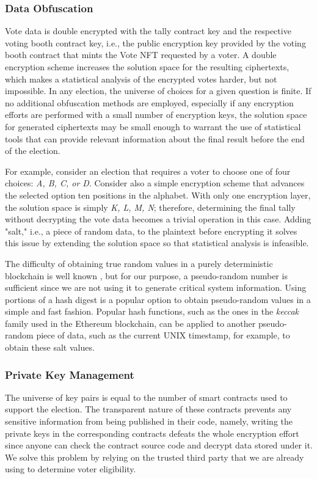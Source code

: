 \documentclass[../main.tex]{subfiles}
\begin{document}
\subsubsection{Data Obfuscation}
\label{sec:data_obfuscation}
Vote data is double encrypted with the tally contract key and the respective voting booth contract key, i.e., the public encryption key provided by the voting booth contract that mints the Vote NFT requested by a voter. A double encryption scheme increases the solution space for the resulting ciphertexts, which makes a statistical analysis of the encrypted votes harder, but not impossible. In any election, the universe of choices for a given question is finite. If no additional obfuscation methods are employed, especially if any encryption efforts are performed with a small number of encryption keys, the solution space for generated ciphertexts may be small enough to warrant the use of statistical tools that can provide relevant information about the final result before the end of the election.
\par
For example, consider an election that requires a voter to choose one of four choices: \textit{A, B, C, or D}. Consider also a simple encryption scheme that advances the selected option ten positions in the alphabet. With only one encryption layer, the solution space is simply \textit{K, L, M, N}; therefore, determining the final tally without decrypting the vote data becomes a trivial operation in this case. Adding "salt," i.e., a piece of random data, to the plaintext before encrypting it solves this issue by extending the solution space so that statistical analysis is infeasible.
\par
The difficulty of obtaining true random values in a purely deterministic blockchain is well known \cite{Antonopoulos2018}, but for our purpose, a pseudo-random number is sufficient since we are not using it to generate critical system information. Using portions of a hash digest is a popular option to obtain pseudo-random values in a simple and fast fashion. Popular hash functions, such as the ones in the \textit{keccak} family used in the Ethereum blockchain, can be applied to another pseudo-random piece of data, such as the current UNIX timestamp, for example, to obtain these salt values.

\subsubsection{Private Key Management}
The universe of key pairs is equal to the number of smart contracts used to support the election. The transparent nature of these contracts prevents any sensitive information from being published in their code, namely, writing the private keys in the corresponding contracts defeats the whole encryption effort since anyone can check the contract source code and decrypt data stored under it. We solve this problem by relying on the trusted third party that we are already using to determine voter eligibility.
\end{document}
